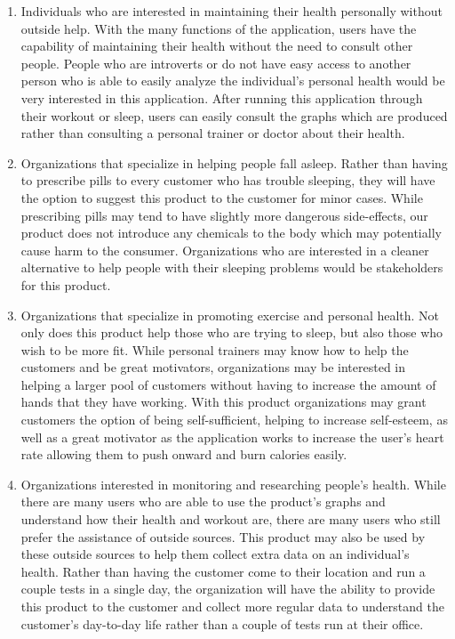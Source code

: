 \documentclass[letterpaper,english, 12pt]{scrreprt}
\begin{document}
\begin{enumerate}
	\item Individuals who are interested in maintaining their health personally without outside help. With the many functions of the application, users have the capability of maintaining their health without the need to consult other people. People who are introverts or do not have easy access to another person who is able to easily analyze the individual's personal health would be very interested in this application. After running this application through their workout or sleep, users can easily consult the graphs which are produced rather than consulting a personal trainer or doctor about their health.
	\item Organizations that specialize in helping people fall asleep. Rather than having to prescribe pills to every customer who has trouble sleeping, they will have the option to suggest this product to the customer for minor cases. While prescribing pills may tend to have slightly more dangerous side-effects, our product does not introduce any chemicals to the body which may potentially cause harm to the consumer. Organizations who are interested in a cleaner alternative to help people with their sleeping problems would be stakeholders for this product.
	\item Organizations that specialize in promoting exercise and personal health. Not only does this product help those who are trying to sleep, but also those who wish to be more fit. While personal trainers may know how to help the customers and be great motivators, organizations may be interested in helping a larger pool of customers without having to increase the amount of hands that they have working. With this product organizations may grant customers the option of being self-sufficient, helping to increase self-esteem, as well as a great motivator as the application works to increase the user's heart rate allowing them to push onward and burn calories easily.
	\item Organizations interested in monitoring and researching people's health. While there are many users who are able to use the product's graphs and understand how their health and workout are, there are many users who still prefer the assistance of outside sources. This product may also be used by these outside sources to help them collect extra data on an individual's health. Rather than having the customer come to their location and run a couple tests in a single day, the organization will have the ability to provide this product to the customer and collect more regular data to understand the customer's day-to-day life rather than a couple of tests run at their office.
\end{enumerate}
\end{document}

